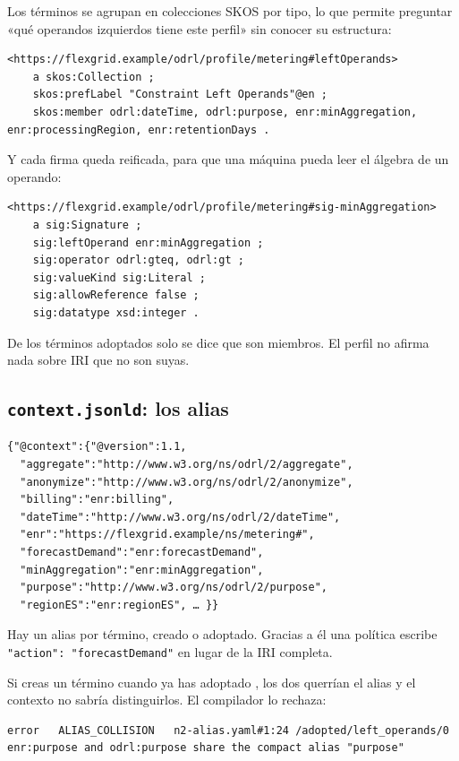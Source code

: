 Los términos se agrupan en colecciones SKOS por tipo, lo que permite preguntar «qué operandos izquierdos tiene
este perfil» sin conocer su estructura:

\begin{lstlisting}[style=ttl]
<https://flexgrid.example/odrl/profile/metering#leftOperands>
    a skos:Collection ;
    skos:prefLabel "Constraint Left Operands"@en ;
    skos:member odrl:dateTime, odrl:purpose, enr:minAggregation, enr:processingRegion, enr:retentionDays .
\end{lstlisting}

Y cada firma queda reificada, para que una máquina pueda leer el álgebra de un operando:

\begin{lstlisting}[style=ttl]
<https://flexgrid.example/odrl/profile/metering#sig-minAggregation>
    a sig:Signature ;
    sig:leftOperand enr:minAggregation ;
    sig:operator odrl:gteq, odrl:gt ;
    sig:valueKind sig:Literal ;
    sig:allowReference false ;
    sig:datatype xsd:integer .
\end{lstlisting}

De los términos adoptados solo se dice que son miembros. El perfil no afirma nada sobre IRI que no son suyas.

\subsection{\texttt{context.jsonld}: los alias}

\begin{lstlisting}[style=json]
{"@context":{"@version":1.1,
  "aggregate":"http://www.w3.org/ns/odrl/2/aggregate",
  "anonymize":"http://www.w3.org/ns/odrl/2/anonymize",
  "billing":"enr:billing",
  "dateTime":"http://www.w3.org/ns/odrl/2/dateTime",
  "enr":"https://flexgrid.example/ns/metering#",
  "forecastDemand":"enr:forecastDemand",
  "minAggregation":"enr:minAggregation",
  "purpose":"http://www.w3.org/ns/odrl/2/purpose",
  "regionES":"enr:regionES", … }}
\end{lstlisting}

Hay un alias por término, creado o adoptado. Gracias a él una política escribe \texttt{"action": "forecastDemand"}
en lugar de la IRI completa.

\begin{trampaHabitual}
Si creas un término  cuando ya has adoptado , los dos querrían el alias
 y el contexto no sabría distinguirlos. El compilador lo rechaza:

\begin{lstlisting}[style=out]
error   ALIAS_COLLISION   n2-alias.yaml#1:24 /adopted/left_operands/0 enr:purpose and odrl:purpose share the compact alias "purpose"
\end{lstlisting}
\end{trampaHabitual}

